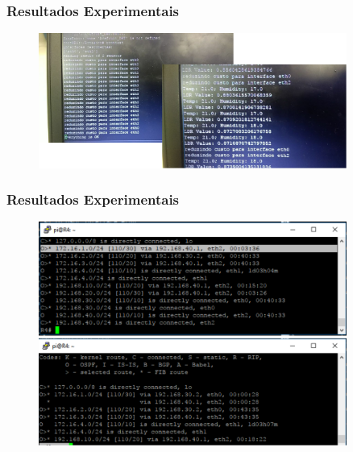 
\begin{frame}
	\frametitle{Resultados Experimentais}

	\begin{figure}[h]
		\centering
		\includegraphics[width=0.9\textwidth]{"../Relatorio/Artigo IoT-G4/figs/resultado2"}
		\label{resultado2}
 	\end{figure}
\end{frame}


\begin{frame}
	\frametitle{Resultados Experimentais}

	\begin{figure}[h]
		\centering
		\includegraphics[width=0.9\textwidth]{"../Relatorio/Artigo IoT-G4/figs/resultado3"}
		\label{resultado3}
 	\end{figure}
\end{frame}


